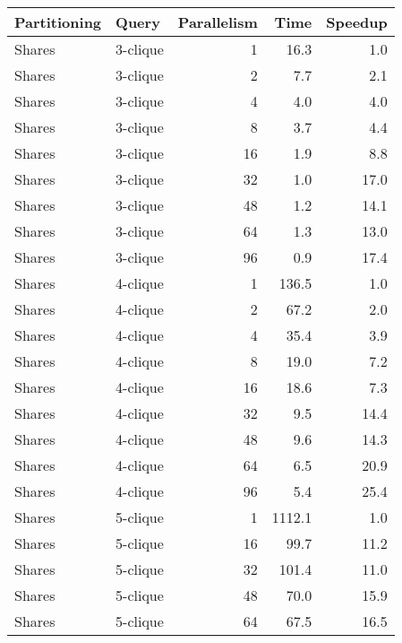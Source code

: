 \begin{tabular}{llr|rr}
\toprule
  Partitioning &     Query &  Parallelism &    Time &  Speedup \\
\midrule
        Shares &  3-clique &            1 &    16.3 &      1.0 \\
        Shares &  3-clique &            2 &     7.7 &      2.1 \\
        Shares &  3-clique &            4 &     4.0 &      4.0 \\
        Shares &  3-clique &            8 &     3.7 &      4.4 \\
        Shares &  3-clique &           16 &     1.9 &      8.8 \\
        Shares &  3-clique &           32 &     1.0 &     17.0 \\
        Shares &  3-clique &           48 &     1.2 &     14.1 \\
        Shares &  3-clique &           64 &     1.3 &     13.0 \\
        Shares &  3-clique &           96 &     0.9 &     17.4 \\
        Shares &  4-clique &            1 &   136.5 &      1.0 \\
        Shares &  4-clique &            2 &    67.2 &      2.0 \\
        Shares &  4-clique &            4 &    35.4 &      3.9 \\
        Shares &  4-clique &            8 &    19.0 &      7.2 \\
        Shares &  4-clique &           16 &    18.6 &      7.3 \\
        Shares &  4-clique &           32 &     9.5 &     14.4 \\
        Shares &  4-clique &           48 &     9.6 &     14.3 \\
        Shares &  4-clique &           64 &     6.5 &     20.9 \\
        Shares &  4-clique &           96 &     5.4 &     25.4 \\
        Shares &  5-clique &            1 &  1112.1 &      1.0 \\
        Shares &  5-clique &           16 &    99.7 &     11.2 \\
        Shares &  5-clique &           32 &   101.4 &     11.0 \\
        Shares &  5-clique &           48 &    70.0 &     15.9 \\
        Shares &  5-clique &           64 &    67.5 &     16.5 \\

\end{tabular}
